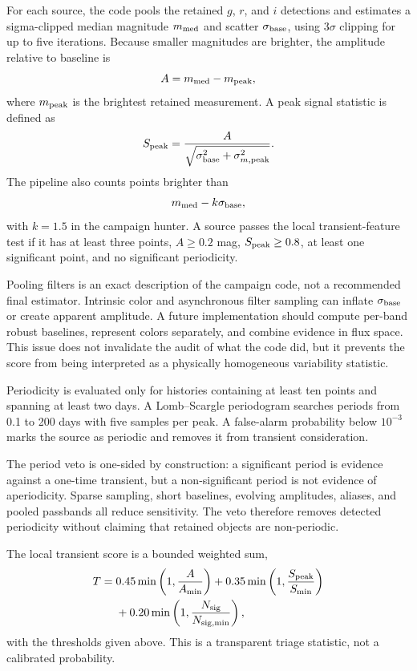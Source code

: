 \documentclass[11pt]{article}
\begin{document}
For each source, the code pools the retained $g$, $r$, and $i$ detections and estimates a sigma-clipped median magnitude $m_{\rm med}$ and scatter $\sigma_{\rm base}$, using 3$\sigma$ clipping for up to five iterations. Because smaller magnitudes are brighter, the amplitude relative to baseline is
\begin{equation}
  A = m_{\rm med} - m_{\rm peak},
\end{equation}
where $m_{\rm peak}$ is the brightest retained measurement. A peak signal statistic is defined as
\begin{equation}
  S_{\rm peak} = \frac{A}{\sqrt{\sigma_{\rm base}^{2} + \sigma_{m,\rm peak}^{2}}}.
\end{equation}
The pipeline also counts points brighter than
\begin{equation}
  m_{\rm med} - k\sigma_{\rm base},
\end{equation}
with $k=1.5$ in the campaign hunter. A source passes the local transient-feature test if it has at least three points, $A\geq0.2$ mag, $S_{\rm peak}\geq0.8$, at least one significant point, and no significant periodicity.

Pooling filters is an exact description of the campaign code, not a recommended final estimator. Intrinsic color and asynchronous filter sampling can inflate $\sigma_{\rm base}$ or create apparent amplitude. A future implementation should compute per-band robust baselines, represent colors separately, and combine evidence in flux space. This issue does not invalidate the audit of what the code did, but it prevents the score from being interpreted as a physically homogeneous variability statistic.

Periodicity is evaluated only for histories containing at least ten points and spanning at least two days. A Lomb--Scargle periodogram \citep{vanderplas2018} searches periods from 0.1 to 200 days with five samples per peak. A false-alarm probability below $10^{-3}$ marks the source as periodic and removes it from transient consideration.

The period veto is one-sided by construction: a significant period is evidence against a one-time transient, but a non-significant period is not evidence of aperiodicity. Sparse sampling, short baselines, evolving amplitudes, aliases, and pooled passbands all reduce sensitivity. The veto therefore removes detected periodicity without claiming that retained objects are non-periodic.

The local transient score is a bounded weighted sum,
\begin{equation}
\begin{split}
T ={}& 0.45\min\left(1,\frac{A}{A_{\min}}\right)
 + 0.35\min\left(1,\frac{S_{\rm peak}}{S_{\min}}\right) \\
&+ 0.20\min\left(1,\frac{N_{\rm sig}}{N_{\rm sig,min}}\right),
\end{split}
\label{eq:transient-score}
\end{equation}
with the thresholds given above. This is a transparent triage statistic, not a calibrated probability.
\end{document}
